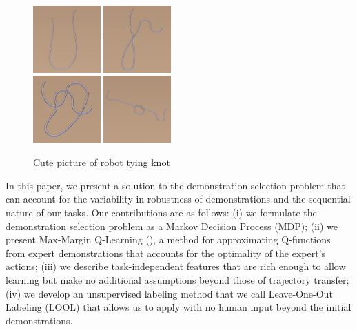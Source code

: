 \begin{figure}[t]
  \centering
    \noindent
    \includegraphics[width=0.23\textwidth]{figures/labeledex0_step0.png}\hspace{1em}%
    \includegraphics[width=0.23\textwidth]{figures/labeledex0_step1.png}\\[1em]
    \includegraphics[width=0.23\textwidth]{figures/labeledex0_step2.png}\hspace{1em}%
    \includegraphics[width=0.23\textwidth]{figures/labeledex0_step3.png}\par
  \caption{Cute picture of robot tying knot}
  \label{fig:knot_steps}
\end{figure}

In this paper, we present a solution to the demonstration selection problem that
can account for the variability in robustness of demonstrations and the
sequential nature of our tasks. Our contributions are as follows:
(i) we formulate the demonstration selection problem as a Markov Decision
Process (MDP); (ii) we present Max-Margin Q-Learning (\mmql{}), a method for
approximating Q-functions from expert demonstrations that accounts for the
optimality of the expert's actions; (iii) we describe task-independent
features that are rich enough to allow learning but make no additional
assumptions beyond those of trajectory transfer; (iv) we develop an unsupervised
labeling method that we call Leave-One-Out Labeling (LOOL) that allows
us to apply \mmql{} with no human input beyond the initial demonstrations.

